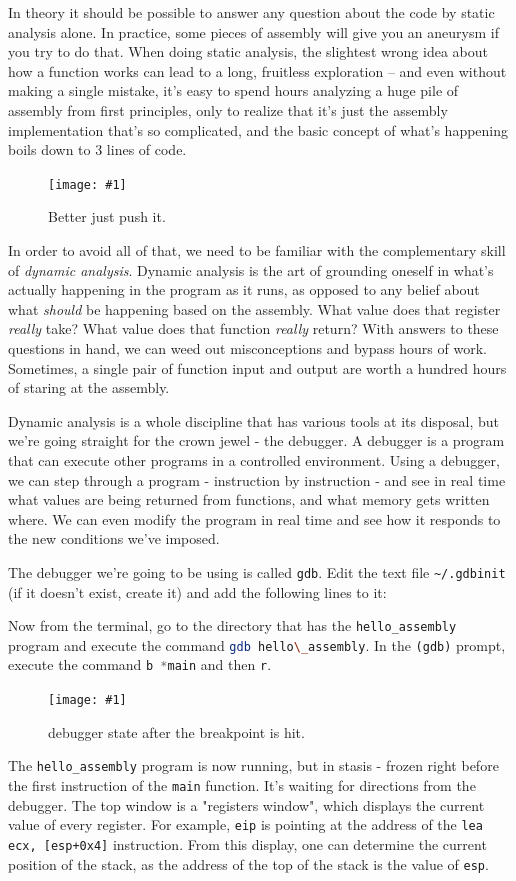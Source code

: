 \documentclass{article}
\newcommand{\displayimagecap}[2] {
\begin{figure}
    \centering
    \texttt{[image: \#1]} 
    \caption{#2}
\end{figure}
}
\newcommand{\wrapimagerightcap}[2] {
    \begin{figure}\begin{center}\texttt{[image: \#1]}\end{center}\caption{#2}\end{figure}}
\newcommand{\xcode}[2]{\colorbox{ubuntuback}{\lstinline[language=#1]|#2|}}
\newcommand{\asm}[1]{\xcode{{[x86masm]assembler}}{#1}}
\newcommand{\code}[1]{\colorbox{ubuntuback}{\texttt{#1}}}
\newcommand{\gdb}[1]{\xcode{C}{#1}}
\begin{document}
In theory it should be possible to answer any question about the code by static analysis alone. In practice, some pieces of assembly will give you an aneurysm if you try to do that. When doing static analysis, the slightest wrong idea about how a function works can lead to a long, fruitless exploration -- and even without making a single mistake, it's easy to spend hours analyzing a huge pile of assembly from first principles, only to realize that it's just the assembly implementation that's so complicated, and the basic concept of what's happening boils down to 3 lines of code. 

\wrapimagerightcap{./images/rube_goldberg.jpg}{Better just push it.}
In order to avoid all of that, we need to be familiar with the complementary skill of \textit{dynamic analysis}.  Dynamic analysis is the art of grounding oneself in what's actually happening in the program as it runs, as opposed to any belief about what \textit{should} be happening based on the assembly. What value does that register \textit{really} take? What value does that function \textit{really} return? With answers to these questions in hand, we can weed out misconceptions and bypass hours of work. Sometimes, a single pair of function input and output are worth a hundred hours of staring at the assembly.

Dynamic analysis is a whole discipline that has various tools at its disposal, but we're going straight for the crown jewel - the debugger. A debugger is a program that can execute other programs in a controlled environment. Using a debugger, we can step through a program - instruction by instruction - and see in real time what values are being returned from functions, and what memory gets written where. We can even modify the program in real time and see how it responds to the new conditions we've imposed.

The debugger we're going to be using is called \code{gdb}. Edit the text file \code{\textasciitilde /.gdbinit} (if it doesn't exist, create it) and add the following lines to it:


Now from the terminal, go to the directory that has the \code{hello\_assembly} program and execute the command \xcode{bash}{gdb hello\_assembly}. In the \code{(gdb)} prompt, execute the command \gdb{b *main} and then \gdb{r}.

\displayimagecap{./images/hello_assembly_debugger.png}{debugger state after the breakpoint is hit.}

The \code{hello\_assembly} program is now running, but in stasis - frozen right before the first instruction of the \code{main} function. It's waiting for directions from the debugger. The top window is a "registers window", which displays the current value of every register. For example, \code{eip} is pointing at the address of the \asm{lea ecx, [esp+0x4]} instruction. From this display, one can determine the current position of the stack, as the address of the top of the stack is the value of \code{esp}.
\end{document}
